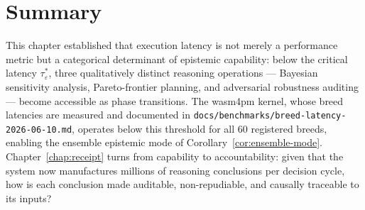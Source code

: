 \section{Summary}
\label{sec:speed-summary}

This chapter established that execution latency is not merely a performance metric but a
categorical determinant of epistemic capability: below the critical latency $\tau^*_\varepsilon$,
three qualitatively distinct reasoning operations --- Bayesian sensitivity analysis,
Pareto-frontier planning, and adversarial robustness auditing --- become accessible as
phase transitions.  The wasm4pm kernel, whose breed latencies are measured and documented
in \texttt{docs/benchmarks/breed-latency-2026-06-10.md}, operates below this threshold
for all 60 registered breeds, enabling the ensemble epistemic mode of Corollary~\ref{cor:ensemble-mode}.
Chapter~\ref{chap:receipt} turns from capability to accountability: given that the system
now manufactures millions of reasoning conclusions per decision cycle, how is each
conclusion made auditable, non-repudiable, and causally traceable to its inputs?
